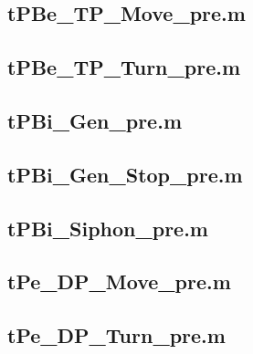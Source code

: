 \documentclass[runningheads,a4paper]{llncs}
\newcommand{\GPenSIM}{../GPenSIM}
\begin{document}
\subsection{tPBe\_TP\_Move\_pre.m}
\label{app:tPBe_TP_Move_pre}


\subsection{tPBe\_TP\_Turn\_pre.m}
\label{app:tPBe_TP_Turn_pre}


\subsection{tPBi\_Gen\_pre.m}
\label{app:tPBi_Gen_pre}


\subsection{tPBi\_Gen\_Stop\_pre.m}
\label{app:tPBi_Gen_Stop_pre}


\subsection{tPBi\_Siphon\_pre.m}
\label{app:tPBi_Siphon_pre}


\subsection{tPe\_DP\_Move\_pre.m}
\label{app:tPe_DP_Move_pre}


\subsection{tPe\_DP\_Turn\_pre.m}
\label{app:tPe_DP_Turn_pre}

\end{document}
